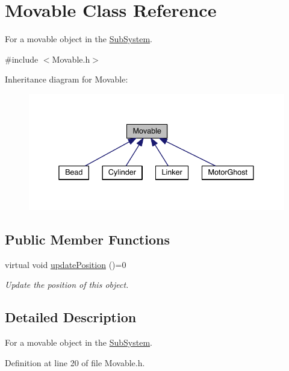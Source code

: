 \hypertarget{classMovable}{\section{Movable Class Reference}
\label{classMovable}
}


For a movable object in the \hyperlink{classSubSystem}{Sub\+System}.  




{\ttfamily \#include $<$Movable.\+h$>$}



Inheritance diagram for Movable\+:\nopagebreak
\begin{figure}[H]
\begin{center}
\leavevmode
\includegraphics[width=338pt]{classMovable__inherit__graph}
\end{center}
\end{figure}
\subsection*{Public Member Functions}
\begin{DoxyCompactItemize}
\item 
virtual void \hyperlink{classMovable_ac46982b0e79d846334e8cf15ba0b543d}{update\+Position} ()=0
\begin{DoxyCompactList}\small\item\em Update the position of this object. \end{DoxyCompactList}\end{DoxyCompactItemize}


\subsection{Detailed Description}
For a movable object in the \hyperlink{classSubSystem}{Sub\+System}. 

Definition at line 20 of file Movable.\+h.



